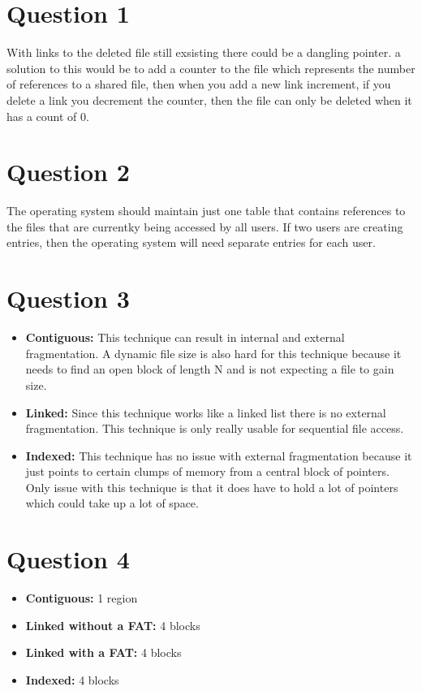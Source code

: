 \documentclass[11pt]{article}
\begin{document}
\maketitle

\section*{Question 1}
With links to the deleted file still exsisting there could be 
a dangling pointer. a solution to this would be to add
a counter to the file which represents the number of references
to a shared file, then when you add a new link increment, if
you delete a link you decrement the counter, then the file can 
only be deleted when it has a count of 0.
\section*{Question 2}
    The operating system should maintain just one table that 
    contains references to the files that are currentky being 
    accessed by all users. If two users are creating 
    entries, then the operating system will need separate
    entries for each user. 
\section*{Question 3}
\begin{itemize}
    \item \textbf{Contiguous:}
        This technique can result in internal and external 
        fragmentation. A dynamic file size is also hard for 
        this technique because it needs to find an open block
        of length N and is not expecting a file to gain size. 
    \item \textbf{Linked:}
        Since this technique works like a linked list there is 
        no external fragmentation. This technique is only really 
        usable for sequential file access.
    \item \textbf{Indexed:}
        This technique has no issue with external fragmentation 
        because it just points to certain clumps of memory from 
        a central block of pointers. Only issue with this technique
        is that it does have to hold a lot of pointers which could 
        take up a lot of space.
\end{itemize}
\section*{Question 4}
\begin{itemize}
    \item \textbf{Contiguous:}
        1 region
    \item \textbf{Linked without a FAT:}
        4 blocks
    \item \textbf{Linked with a FAT:}
        4 blocks
    \item \textbf{Indexed:}
        4 blocks
\end{itemize}
\end{document}

